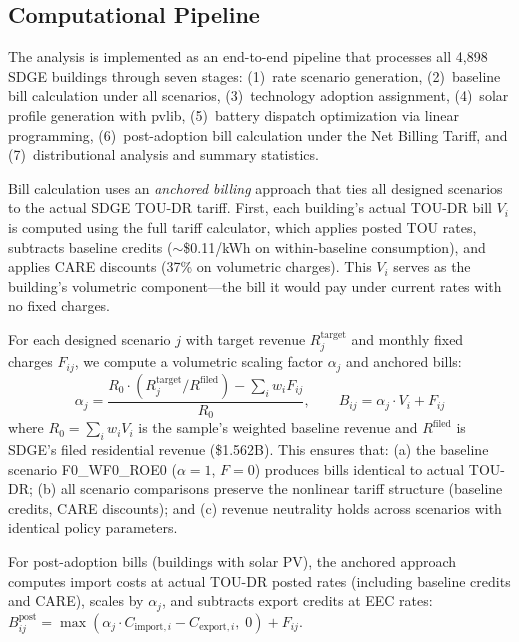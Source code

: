 \documentclass[12pt]{article}
\begin{document}


\subsection{Computational Pipeline}
\label{sec:pipeline}

The analysis is implemented as an end-to-end pipeline that processes all 4,898 SDGE buildings through seven stages: (1)~rate scenario generation, (2)~baseline bill calculation under all scenarios, (3)~technology adoption assignment, (4)~solar profile generation with pvlib, (5)~battery dispatch optimization via linear programming, (6)~post-adoption bill calculation under the Net Billing Tariff, and (7)~distributional analysis and summary statistics.

Bill calculation uses an \textit{anchored billing} approach that ties all designed scenarios to the actual SDGE TOU-DR tariff. First, each building's actual TOU-DR bill $V_i$ is computed using the full tariff calculator, which applies posted TOU rates, subtracts baseline credits ($\sim$\$0.11/kWh on within-baseline consumption), and applies CARE discounts (37\% on volumetric charges). This $V_i$ serves as the building's volumetric component---the bill it would pay under current rates with no fixed charges.

For each designed scenario $j$ with target revenue $R_j^{\text{target}}$ and monthly fixed charges $F_{ij}$, we compute a volumetric scaling factor $\alpha_j$ and anchored bills:
\begin{equation}
\alpha_j = \frac{R_0 \cdot (R_j^{\text{target}} / R^{\text{filed}}) - \sum_i w_i F_{ij}}{R_0}, \qquad
B_{ij} = \alpha_j \cdot V_i + F_{ij}
\end{equation}
where $R_0 = \sum_i w_i V_i$ is the sample's weighted baseline revenue and $R^{\text{filed}}$ is SDGE's filed residential revenue (\$1.562B). This ensures that: (a) the baseline scenario F0\_WF0\_ROE0 ($\alpha = 1$, $F = 0$) produces bills identical to actual TOU-DR; (b) all scenario comparisons preserve the nonlinear tariff structure (baseline credits, CARE discounts); and (c) revenue neutrality holds across scenarios with identical policy parameters.

For post-adoption bills (buildings with solar PV), the anchored approach computes import costs at actual TOU-DR posted rates (including baseline credits and CARE), scales by $\alpha_j$, and subtracts export credits at EEC rates: $B_{ij}^{\text{post}} = \max(\alpha_j \cdot C_{\text{import},i} - C_{\text{export},i},\; 0) + F_{ij}$.
\end{document}
